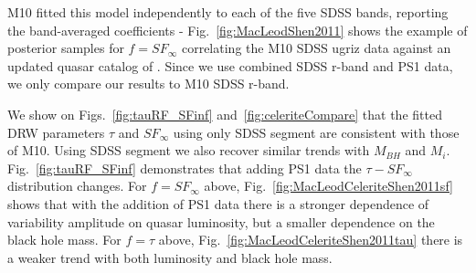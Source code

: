 \documentclass[twocolumn]{aastex62}
\let\oldAA\AA
\renewcommand{\AA}{\text{\normalfont\oldAA}}
\begin{document}
\begin{figure*}
\caption{Long-term variability ($SF_{\infty}$), and characteristic timescale ($\tau$), as a function of absolute i-band magnitude (K-corrected to redshift 2, proxy for bolometric luminosity), virial black hole mass, and redshift. }
\label{fig:sf_tau_bh_mass_luminosity}
\end{figure*} 



\begin{figure*}
\caption{Left : the Eddigton ratio $L/L_{Edd}$ (from \citealt{shen2011}) plotted as a function of $M_{BH}$  vs $M_{i}$. Right:  the asymptotic variability amplitude $SF_{\infty}$,  corrected for the wavelength dependence to $4000 \AA$, as a function of the Eddington ratio.  The slope of -0.9 (solid line) is much steeper than -0.23 found by M10 with the SDSS only data. }
\label{fig:eddington_ratio}
\end{figure*} 



M10 fitted  this model independently to each of the five SDSS bands, reporting the band-averaged coefficients - Fig.~\ref{fig:MacLeodShen2011} shows the example of posterior samples for $f=SF_{\infty}$ correlating the  M10 SDSS ugriz data against an updated quasar catalog of \citet{shen2011}. Since we use combined SDSS r-band and PS1 data, we only compare our results to M10 SDSS r-band.  


\begin{figure*}
\caption{Table 1 in M10 reported the band-averaged values for fit coefficients A,C,D for Eq.~\ref{eq:powlawmodel}.  Shown here are samples from posterior MCMC draws using M10 results for  $f=SF_{\infty}$, against \citealt{shen2011} $M_{i}$ and $M_{BH}$. Because the mean of posterior for SDSS r-band results only  (bold, solid lines) are different from the mean of band-averaged values (dashed lines),  we compare our SDSS-PS1 combined r-band results against M10 SDSS r-band only.}
\label{fig:MacLeodShen2011}
\end{figure*} 


We show on Figs.~\ref{fig:tauRF_SFinf} and~\ref{fig:celeriteCompare} that the fitted DRW parameters  $\tau$ and $SF_{\infty}$  using only SDSS segment are consistent with those of M10. Using SDSS segment we also recover similar trends with $M_{BH}$ and $M_{i}$. Fig.~\ref{fig:tauRF_SFinf} demonstrates that adding PS1 data the $\tau - SF_{\infty}$ distribution changes.  For $f=SF_{\infty}$ above, Fig.~\ref{fig:MacLeodCeleriteShen2011sf} shows that with the addition of PS1 data there is a stronger dependence of variability amplitude on quasar luminosity, but a smaller dependence on the black hole mass. For $f=\tau$ above, Fig.~\ref{fig:MacLeodCeleriteShen2011tau} there is a weaker trend with both luminosity and black hole mass. 
\end{document}
